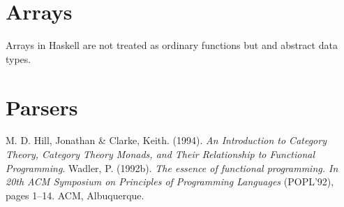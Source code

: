 \documentclass[a4paper, onecolumn]{article}
\begin{document}
\section{Arrays}
Arrays in Haskell are not treated as ordinary functions but and abstract data types.   

\section{Parsers}

\begin{thebibliography}{9}
M. D. Hill, Jonathan & Clarke, Keith. (1994). \textit{An Introduction to Category Theory, Category Theory Monads, and Their Relationship to Functional Programming}.
Wadler, P. (1992b). \textit{The essence of functional programming. In
20th ACM Symposium on Principles of Programming Languages}
(POPL’92), pages 1–14. ACM, Albuquerque.
\end{thebibliography}
\end{document}
